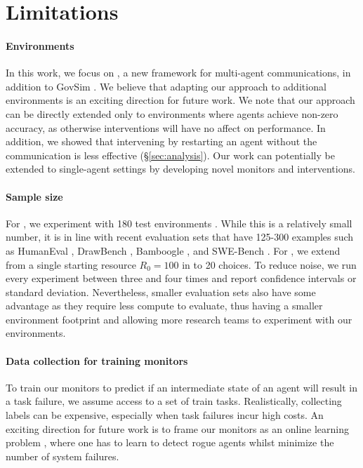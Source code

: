 
\section*{Limitations}

\paragraph{Environments} In this work, we focus on \ourenv{}, a new framework for multi-agent communications, in addition to GovSim \cite{piatti2024cooperate}. We believe that adapting our approach to additional environments is an exciting direction for future work.
We note that our approach can be directly extended only to environments where agents achieve non-zero accuracy, as otherwise interventions will have no affect on performance.
In addition, we showed that intervening by restarting an agent without the communication is less effective (\S\ref{sec:analysis}).
Our work can potentially be extended to single-agent settings by developing novel monitors and interventions.

\paragraph{Sample size}
For \ourenv{}, we experiment with 180 test environments . While this is a relatively small number, it is in line with recent evaluation sets that have 125-300 examples such as HumanEval \cite{chen2021evaluatinglargelanguagemodels}, DrawBench \cite{saharia2022photorealistic}, Bamboogle \cite{press-etal-2023-measuring}, and SWE-Bench \cite{jimenez2024swebench}. For \govsim{}, we extend from a single starting resource $R_0=100$ in \cite{piatti2024cooperate} to 20 choices. 
To reduce noise, we run every experiment between three and four times and report confidence intervals or standard deviation.
Nevertheless, smaller evaluation sets also have some advantage as they require less compute to evaluate, thus having a smaller environment footprint \cite{10.1145/3381831} and allowing more research teams to experiment with our environments.  

\paragraph{Data collection for training monitors}
To train our monitors to predict if an intermediate state of an agent will result in a task failure, we assume access to a set of train tasks. Realistically, collecting labels can be expensive, especially when task failures incur high costs. An exciting direction for future work is to frame our monitors as an online learning problem \cite{LITTLESTONE1994212, 10.5555/3041838.3041955, park2024llmagentsregretcase}, where one has to learn to detect rogue agents whilst minimize the number of system failures.

